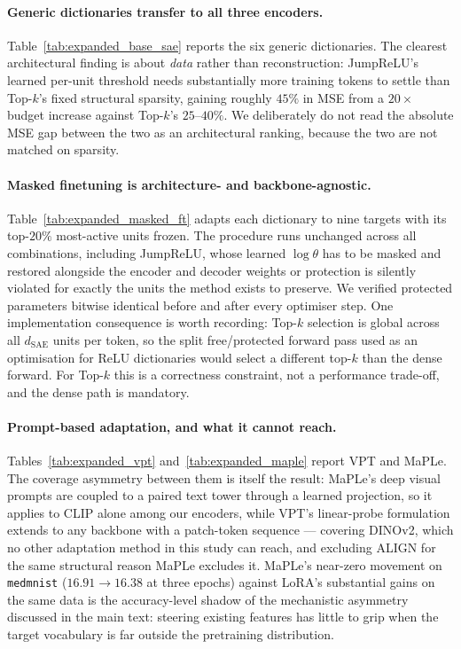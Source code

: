 \paragraph{Generic dictionaries transfer to all three encoders.}
Table~\ref{tab:expanded_base_sae} reports the six generic dictionaries. The clearest
architectural finding is about \emph{data} rather than reconstruction: JumpReLU's learned
per-unit threshold needs substantially more training tokens to settle than Top-$k$'s
fixed structural sparsity, gaining roughly $45\%$ in MSE from a $20\times$ budget
increase against Top-$k$'s $25$--$40\%$. We deliberately do not read the absolute MSE gap
between the two as an architectural ranking, because the two are not matched on
sparsity.

\paragraph{Masked finetuning is architecture- and backbone-agnostic.}
Table~\ref{tab:expanded_masked_ft} adapts each dictionary to nine targets with its
top-$20\%$ most-active units frozen. The procedure runs unchanged across all
combinations, including JumpReLU, whose learned $\log\theta$ has to be masked and
restored alongside the encoder and decoder weights or protection is silently violated
for exactly the units the method exists to preserve. We verified protected parameters
bitwise identical before and after every optimiser step. One implementation
consequence is worth recording: Top-$k$ selection is global across all $d_{\mathrm{SAE}}$
units per token, so the split free/protected forward pass used as an optimisation for
ReLU dictionaries would select a different top-$k$ than the dense forward. For Top-$k$
this is a correctness constraint, not a performance trade-off, and the dense path is
mandatory.

\paragraph{Prompt-based adaptation, and what it cannot reach.}
Tables~\ref{tab:expanded_vpt} and~\ref{tab:expanded_maple} report VPT and MaPLe. The
coverage asymmetry between them is itself the result: MaPLe's deep visual prompts are
coupled to a paired text tower through a learned projection, so it applies to CLIP alone
among our encoders, while VPT's linear-probe formulation extends to any backbone with a
patch-token sequence --- covering DINOv2, which no other adaptation method in this study
can reach, and excluding ALIGN for the same structural reason MaPLe excludes it.
MaPLe's near-zero movement on \texttt{medmnist} ($16.91 \rightarrow 16.38$ at three
epochs) against LoRA's substantial gains on the same data is the accuracy-level shadow of
the mechanistic asymmetry discussed in the main text: steering existing features has
little to grip when the target vocabulary is far outside the pretraining distribution.

